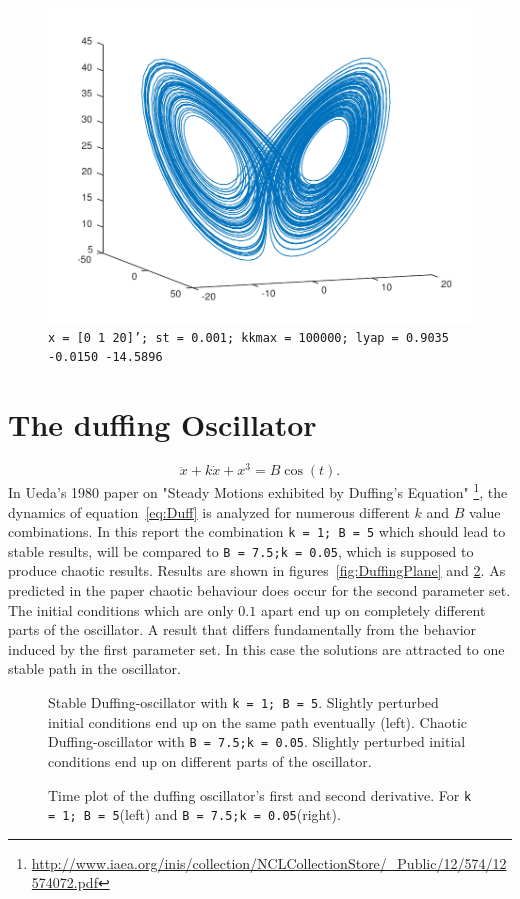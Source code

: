 \begin{figure}
\includegraphics[scale=0.5]{./plots/bestLorenz.pdf}
\caption{\texttt{x = [0 1 20]'; st = 0.001; kkmax = 100000; lyap = 0.9035   -0.0150  -14.5896}}
\label{fig:comp3}
\end{figure}

\section{The duffing Oscillator}
\begin{equation}
\ddot{x} + k\dot{x} + x^3 = B \cos(t).
\label{eq:Duff}
\end{equation}
In Ueda's 1980 paper on "Steady Motions exhibited by Duffing's Equation" \footnote{\url{http://www.iaea.org/inis/collection/NCLCollectionStore/_Public/12/574/12574072.pdf}}, the dynamics of equation~\ref{eq:Duff} is analyzed for numerous different $k$ and $B$ value combinations. In this report the combination \texttt{k = 1; B = 5}  which should lead to stable results, will be compared to \texttt{B = 7.5;k = 0.05}, which is supposed to produce chaotic results. Results are shown in figures~\ref{fig:DuffingPlane} and \ref{fig:DuffingTime}. As predicted in the paper chaotic behaviour does occur for the second parameter set. The initial conditions which are only $0.1$ apart end up on completely different parts of the oscillator. A result that differs fundamentally from the behavior induced by the first parameter set. In this case the solutions are attracted to one stable path in the oscillator.   


\begin{figure}


\caption{Stable Duffing-oscillator with \texttt{k = 1; B = 5}. Slightly perturbed initial conditions end up on the same path eventually (left). Chaotic Duffing-oscillator with \texttt{B = 7.5;k = 0.05}. Slightly perturbed initial conditions end up on different parts of the oscillator.}
\label{fig:DuffingPlane}


\caption{Time plot of the duffing oscillator's first and second derivative. For \texttt{k = 1; B = 5}(left) and \texttt{B = 7.5;k = 0.05}(right). }
\label{fig:DuffingTime}
\end{figure}


